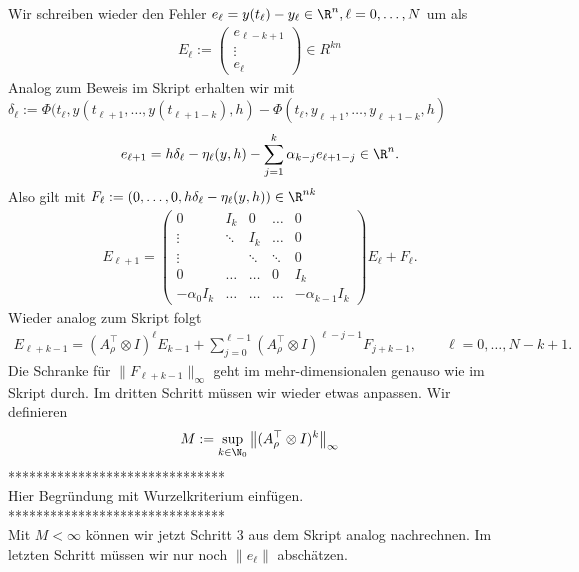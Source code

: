 \begin{solution}
Wir schreiben wieder den Fehler $e_{\ell} = y(t_{\ell}) - y_{\ell} \in \R^n, \ell = 0,\dots,N$ um als
\begin{align*}
  E_{\ell} := \begin{pmatrix}
    e_{\ell - k + 1} \\
    \vdots \\
    e_{\ell}
  \end{pmatrix}
  \in R^{kn}
\end{align*}
Analog zum Beweis im Skript erhalten wir mit
$\delta_{\ell} := \Phi(t_{\ell},y(t_{\ell + 1},\dots,y(t_{\ell+1-k}),h) -
\Phi(t_{\ell},y_{\ell + 1},\dots,y_{\ell+1-k},h)$
\begin{align*}
  e_{\ell + 1} = h\delta_{\ell} - \eta_{\ell}(y,h) - \sum_{j = 1}^k \alpha_{k - j}e_{\ell + 1 - j} \in \R^n.
\end{align*}
Also gilt mit $F_{\ell} := (0,\dots,0,h\delta_{\ell} - \eta_{\ell}(y,h)) \in \R^{nk}$
\begin{align*}
  E_{\ell + 1} = \begin{pmatrix}
    0 & I_k & 0 & \hdots & 0 \\
    \vdots & \ddots & I_k & \hdots & 0\\
    \vdots &  & \ddots & \ddots & 0 \\
    0 & \hdots & \hdots & 0 & I_k \\
    -\alpha_0I_k & \hdots & \hdots & \hdots & -\alpha_{k-1}I_k
  \end{pmatrix}E_{\ell} + F_{\ell}.
\end{align*}
Wieder analog zum Skript folgt
\begin{align*}
  E_{\ell + k - 1} =  \left(A_{\rho}^{\top} \otimes I\right)^{\ell}E_{k-1}
  + \sum_{j = 0}^{\ell - 1}\left(A_{\rho}^{\top} \otimes I\right)^{\ell - j - 1}F_{j + k - 1},
  \qquad \ell = 0,\dots,N-k+1.
\end{align*}
Die Schranke für $\|F_{\ell + k - 1}\|_{\infty}$ geht im mehr-dimensionalen
genauso wie im Skript durch.
Im dritten Schritt müssen wir wieder etwas anpassen. Wir definieren
\begin{align*}
  M := \sup_{k \in \N_0} \left\| (A_{\rho}^{\top} \otimes I)^k\right\|_{\infty}
\end{align*}
******************************* \\
Hier Begründung mit Wurzelkriterium einfügen. \\
******************************* \\
Mit $M < \infty$ können wir jetzt Schritt 3 aus dem Skript analog nachrechnen.
Im letzten Schritt müssen wir nur noch $\|e_{\ell}\|$ abschätzen.
\end{solution}
